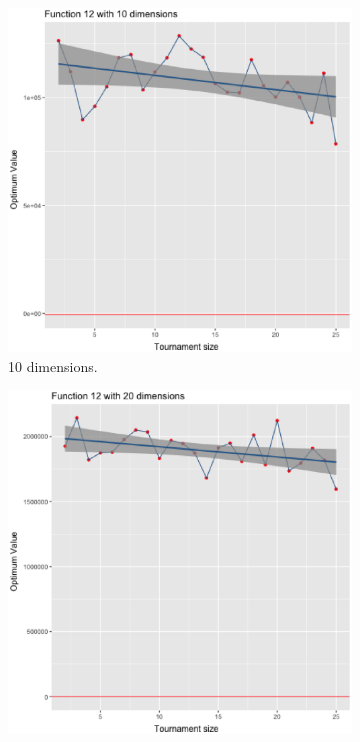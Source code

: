 \begin{figure}[t]
	\begin{subfigure}[b]{0.33\textwidth}
		\centering
		\includegraphics[width=\textwidth]{img/12dim_10.ps}
		\caption{10 dimensions.}
	\end{subfigure}
	\begin{subfigure}[b]{0.33\textwidth}
		\centering
		\includegraphics[width=\textwidth]{img/12dim_20.ps}

\end{subfigure}
\end{figure}
